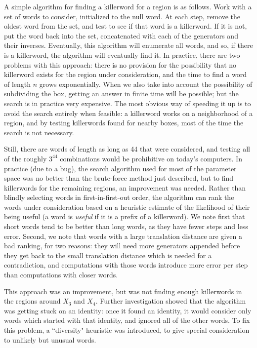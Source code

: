 A simple algorithm for finding a killerword for a region is as follows.
Work with a set of words to consider, initialized to the null word.  At 
each step, remove the oldest word from the set, and test to see if that 
word is a killerword.
If it is not, put the word back into the set, concatenated with each of 
the generators and their inverses.
Eventually, this algorithm will enumerate all words, and so, if there 
is a killerword, the algorithm will eventually find it.  In practice, 
there are two problems with this approach: there is no provision for the possibility that no killerword exists for the region under consideration, 
and the time to find a word of length $n$ grows exponentially.
When we also take into account the possibility of subdividing the box, getting an answer in finite time will be possible; but the search is in practice 
very expensive.  The most obvious way of speeding it up is to avoid 
the search entirely when feasible: a killerword works on a neighborhood of a 
region, and by testing killerwords found for nearby boxes, most of 
the time the search is not necessary.

Still, there are words of length as long as 44 that were considered, and testing all of the roughly $3^{44}$ 
combinations would be prohibitive on today's computers.  In practice 
(due to a bug), the search algorithm used for most of the parameter
space was no better than the brute-force method just described, but to find 
killerwords for the remaining regions, an improvement was needed.  
Rather than blindly selecting words in first-in-first-out order, 
the algorithm can
rank the words under consideration based on a heuristic estimate of 
the likelihood of their being useful (a word is {\it useful} if it is a prefix of a killerword).  
We note first that short words tend to be better than 
long words, as they have fewer steps and less error.
Second, we note that words 
with a large translation distance are given a bad ranking, for two reasons: 
they will need more generators appended before they get back to the 
small translation distance which is needed for a contradiction, and
 computations with those words introduce more error per step than 
computations with closer words.  

This approach was an improvement, but was not finding enough killerwords in the regions 
around $X_3$ and $X_4$.  Further investigation showed that the 
algorithm was getting stuck on an identity: once it found an identity, 
it would consider only words which started with that identity, and 
ignored all of the other words.  To fix this problem, a ``diversity" 
heuristic was introduced, to give special consideration to unlikely but 
unusual words.

